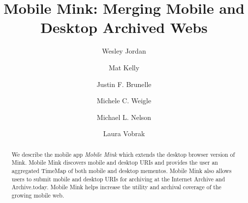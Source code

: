 \documentclass{sig-alternate}
\begin{document}
\title{Mobile Mink: Merging Mobile and Desktop Archived Webs}




\author[1]{Wesley Jordan}
\author[2]{Mat Kelly}
\author[2,3]{Justin F. Brunelle}
\author[2]{Michele C. Weigle}
\author[2]{Michael L. Nelson}
\author[1]{Laura Vobrak}

       
\maketitle
\begin{abstract}
We describe the mobile app \emph{Mobile Mink} which extends the desktop browser version of Mink. Mobile Mink discovers mobile and desktop URIs and provides the user an aggregated TimeMap of both mobile and desktop mementos. Mobile Mink also allows users to submit mobile and desktop URIs for archiving at the Internet Archive and Archive.today. Mobile Mink helps increase the utility and archival coverage of the growing mobile web.
\end{abstract}


\end{document}
